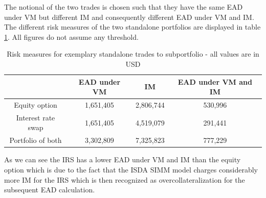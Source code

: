 \documentclass[../Thesis_AHoecherl.tex]{subfiles}
\begin{document}
    The notional of the two trades is chosen such that they have the same \gls{EAD} under \gls{VM} but different \gls{IM} and consequently different \gls{EAD} under \gls{VM} and IM. 
    The different risk measures of the two standalone portfolios are displayed in table \ref{tab:IM threshold example standalone}. All figures do not assume any threshold.
    \begin{table}[htbp]
        \centering
        \begin{tabular}{c|c|c|c}
            & \gls{EAD} under \gls{VM} & \gls{IM} & \gls{EAD} under \gls{VM} and \gls{IM} \\
            \toprule
            Equity option & 1,651,405 & 2,806,744 & 530,996 \\
            Interest rate swap& 1,651,405 & 4,519,079 & 291,441 \\
            \midrule
            Portfolio of both& 3,302,809 & 7,325,823 & 777,229 \\
        \end{tabular}%
        \caption[Risk measures for exemplary standalone trades]{Risk measures for exemplary standalone trades to subportfolio - all values are in USD}
        \label{tab:IM threshold example standalone}
    \end{table}
    As we can see the \gls{IRS} has a lower \gls{EAD} under \gls{VM} and \gls{IM} than the equity option which is due to the fact that the \gls{ISDA SIMM} model charges considerably more \gls{IM} for the \gls{IRS} which is then recognized as overcollateralization for the subsequent \gls{EAD} calculation.
\end{document}
